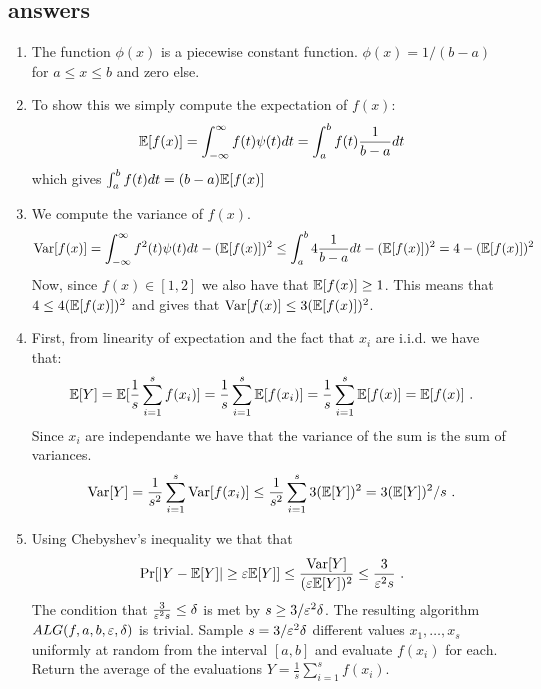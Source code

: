 \documentclass{article}
\begin{document}


\subsection*{answers}
\begin{enumerate}
\item The function $\phi(x)$ is a piecewise constant function. $\phi(x) = 1/(b-a)$ for $a \le x \le b$ and zero else. 
\item To show this we simply compute the expectation of $f(x)$:
$$ {\mathbb E}[f(x)] = \int_{-\infty}^{\infty} f(t) \psi(t)dt = \int_{a}^{b} f(t) \frac{1}{b-a}dt $$
which gives $ \int_{a}^{b} f(t) dt = (b-a){\mathbb E}[f(x)]$
\item We compute the variance of $f(x)$.
$$ {\operatorname{Var}}[f(x)] =  \int_{-\infty}^{\infty} f^{2}(t)\psi(t)dt - ({\mathbb E}[f(x)])^2 \le \int_{a}^{b} 4 \frac{1}{b-a}dt - ({\mathbb E}[f(x)])^2 = 4- ({\mathbb E}[f(x)])^2$$
Now, since $f(x) \in [1,2]$ we also have that ${\mathbb E}[f(x)] \ge 1$. This means that $4 \le 4({\mathbb E}[f(x)])^2$ and gives that ${\operatorname{Var}}[f(x)] \le 3({\mathbb E}[f(x)])^2$.
\item First, from linearity of expectation and the fact that $x_i$ are i.i.d. we have that:
$${\mathbb E}[Y] = {\mathbb E}[\frac{1}{s}\sum_{i=1}^{s}f(x_i)] = \frac{1}{s}\sum_{i=1}^{s}{\mathbb E}[f(x_i)] = \frac{1}{s}\sum_{i=1}^{s}{\mathbb E}[f(x)] = {\mathbb E}[f(x)] \ .$$
Since $x_i$ are independante we have that the variance of the sum is the sum of variances.
$${\operatorname{Var}}[Y] = \frac{1}{s^2}\sum_{i=1}^{s} {\operatorname{Var}}[f(x_i)] \le \frac{1}{s^2}\sum_{i=1}^{s} 3({\mathbb E}[Y])^2 = 3({\mathbb E}[Y])^2/s \ .$$
\item Using Chebyshev's inequality we that that 
$$ \Pr[ |Y - {\mathbb E}[Y]| \ge \varepsilon{\mathbb E}[Y] ] \le \frac{{\operatorname{Var}}[Y]}{(\varepsilon{\mathbb E}[Y])^2} \le \frac{3}{\varepsilon^2 s} \ . $$
The condition that $\frac{3}{\varepsilon^2 s} \le \delta$ is met by $s \ge 3/\varepsilon^2\delta$.
%
The resulting algorithm $ALG(f,a,b,\varepsilon,\delta)$ is trivial. 
Sample $s = 3/\varepsilon^2\delta$ different values 
$x_1, \ldots, x_s$ uniformly at random from the interval $[a,b]$ and evaluate $f(x_i)$ for each.
Return the average of the evaluations $Y = \frac{1}{s}\sum_{i=1}^{s}f(x_i)$.

\end{enumerate}
\pagebreak

\end{document}
